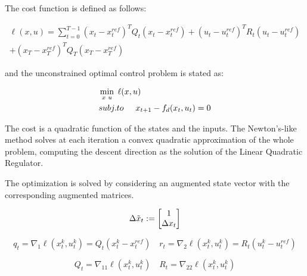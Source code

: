 The cost function is defined as follows:

\begin{equation}\label{Cost function}
\begin{aligned}
        \ell(x,u) = \sum_{t=0}^{T-1} (x_t - x_t^{ref})^TQ_t(x_t - x_t^{ref}) + (u_t-u_t^{ref})^TR_t(u_t-u_t^{ref})\\
        + (x_T - x_T^{ref})^TQ_T(x_T - x_T^{ref})
\end{aligned}
\end{equation}

and the unconstrained optimal control problem is stated as:

\begin{equation}
    \begin{aligned}
        &\min_{x \hspace{0.1cm}u} \hspace{0.1cm}\ell(x,u) \\
        &subj. to \hspace{0.5cm} x_{t+1} - f_d(x_t,u_t) = 0
    \end{aligned}
\end{equation}

The cost is a quadratic function of the states and the inputs. The Newton's-like method solves at each iteration a convex quadratic approximation of the whole problem, computing the descent direction as the solution of the Linear Quadratic Regulator.

The optimization is solved by considering an augmented state vector with the corresponding augmented matrices.

\begin{equation*}
    \Delta\Tilde{x}_t := \begin{bmatrix}
        1 \\
        \Delta x_t\end{bmatrix} 
\end{equation*}

\begin{equation*}
        q_t = \nabla_1 \ell(x_t^k,u_t^k) = Q_t(x_t^k - x_t^{ref}) \quad r_t = \nabla_2 \ell(x_t^k,u_t^k) = R_t(u_t^k - u_t^{ref})
\end{equation*}
            
\begin{equation*}
    Q_t = \nabla_{11} \ell(x_t^k,u_t^k) \quad R_t = \nabla_{22} \ell(x_t^k,u_t^k)
\end{equation*}

